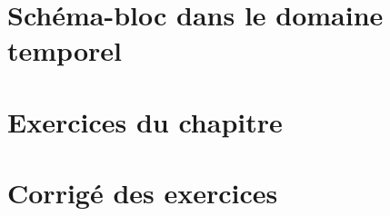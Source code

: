 \section{Schéma-bloc dans le domaine temporel}
\acplhp
\section{Exercices du chapitre}
\small

\setcounter{numexos}{0}
\normalsize
\newpage
\restoregeometry
\captionsetup{width=0.9\linewidth}
\section{Corrigé des exercices}
\small

\normalsize
\restoregeometry
\captionsetup{width=0.9\linewidth}

